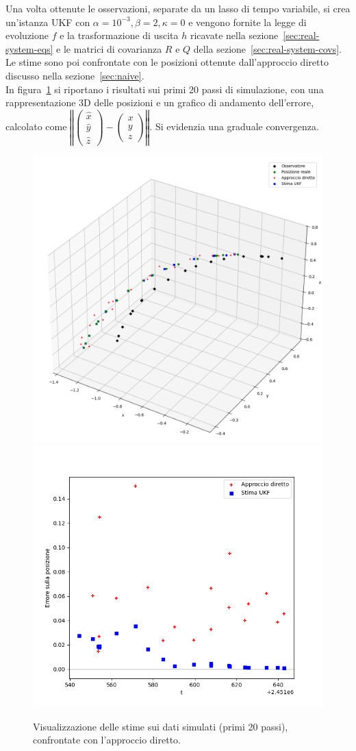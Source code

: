 \documentclass[12pt,a4paper,openright,twoside]{book}
\begin{document}
Una volta ottenute le osservazioni, separate da un lasso di tempo variabile, si crea un'istanza UKF con $\alpha=10^{-3},\beta=2,\kappa=0$ e vengono fornite la legge di evoluzione $f$ e la trasformazione di uscita $h$ ricavate nella sezione~\ref{sec:real-system-eqs} e le matrici di covarianza $R$ e $Q$ della sezione~\ref{sec:real-system-covs}. Le stime sono poi confrontate con le posizioni ottenute dall'approccio diretto discusso nella sezione~\ref{sec:naive}. \\

In figura~\ref{fig:sim20} si riportano i risultati sui primi 20 passi di simulazione, con una rappresentazione 3D delle posizioni e un grafico di andamento dell'errore, calcolato come $\left\Vert\left(\begin{smallmatrix}\hat{x}\\\hat{y}\\\hat{z}\end{smallmatrix}\right)-\left(\begin{smallmatrix}x\\y\\z\end{smallmatrix}\right)\right\Vert$. Si evidenzia una graduale convergenza.

\begin{figure}
    \includegraphics[width=0.55\linewidth]{figures/simulation_20_3d.png}
    \includegraphics[width=0.45\linewidth]{figures/simulation_20_error.png}
    \caption{Visualizzazione delle stime sui dati simulati (primi 20 passi), confrontate con l'approccio diretto.}
    \label{fig:sim20}
    \vspace{2\baselineskip}
\end{figure}
\end{document}
